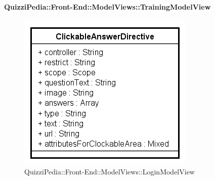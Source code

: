 	
	\paragraph{QuizziPedia::Front-End::ModelViews::TrainingModelView}
	
	\label{QuizziPedia::Front-End::ModelViews::TrainingModelView}
	
	\begin{figure}[ht]
		\centering
		\includegraphics[scale=0.5,keepaspectratio]{UML/Classi/Front-End/QuizziPedia_Front-end_Templates_ClickableAnswerTemplate.png}
		\caption{QuizziPedia::Front-End::ModelViews::LoginModelView}
	\end{figure} \FloatBarrier
	
